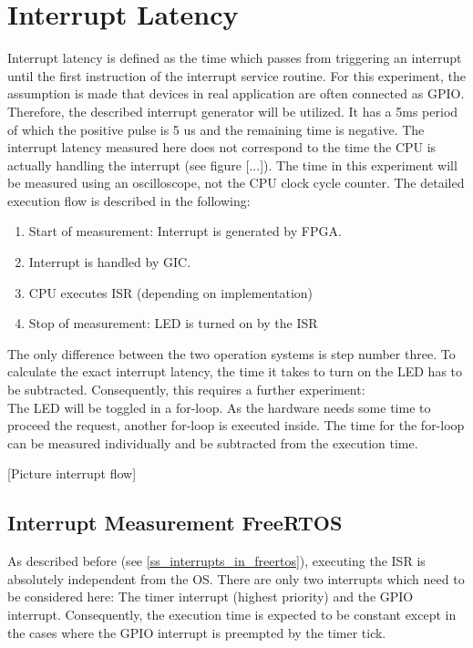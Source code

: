 \section{Interrupt Latency}
Interrupt latency is defined as the time which passes from triggering an interrupt until the first instruction of the interrupt service routine. 
For this  experiment, the assumption is made that devices in real application are often connected as \ac{GPIO}.
Therefore, the described interrupt generator will be utilized.
It has a 5ms period of which the positive pulse is 5 us and the remaining time is negative.
The interrupt latency measured here does not correspond to the time the \ac{CPU} is actually handling the interrupt (see figure [...]).
The time in this experiment will be measured using an oscilloscope, not the \ac{CPU} clock cycle counter.
The detailed execution flow is described in the following:
\begin{enumerate}
	\item Start of measurement: Interrupt is generated by \ac{FPGA}.
	\item Interrupt is handled by \ac{GIC}.
	\item \ac{CPU} executes \ac{ISR} (depending on implementation)
	\item Stop of measurement: \ac{LED} is turned on by the \ac{ISR}
\end{enumerate}
The only difference between the two operation systems is step number three. 
To calculate the exact interrupt latency, the time it takes to turn on the \ac{LED} has to be subtracted.
Consequently, this requires a further experiment:\\
The \ac{LED} will be toggled in a for-loop.
As the hardware needs some time to proceed the request, another for-loop is executed inside.
The time for the for-loop can be measured individually and be subtracted from the execution time.

[Picture interrupt flow]

\subsection{Interrupt Measurement FreeRTOS}
As described before (see \ref{ss_interrupts_in_freertos}), executing the \ac{ISR} is absolutely independent from the \ac{OS}.
There are only two interrupts which need to be considered here: The timer interrupt (highest priority) and the \ac{GPIO} interrupt.
Consequently, the execution time is expected to be constant except in the cases where the \ac{GPIO} interrupt is preempted by the timer tick.

